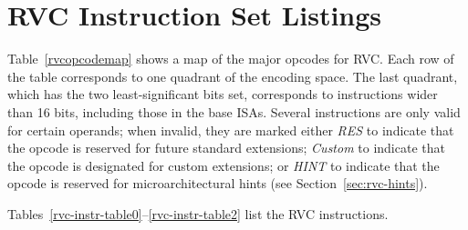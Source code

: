 \clearpage

\section{RVC Instruction Set Listings}

Table~\ref{rvcopcodemap} shows a map of the major opcodes for RVC.
Each row of the table corresponds to one quadrant of the encoding
space.  The last quadrant, which has the two
least-significant bits set, corresponds to instructions wider
than 16 bits, including those in the base ISAs.  Several instructions
are only valid for certain operands; when invalid, they are marked
either {\em RES} to indicate that the opcode is reserved for future
standard extensions; {\em Custom} to indicate that the opcode is designated
for custom extensions; or {\em HINT} to indicate that the opcode
is reserved for microarchitectural hints (see Section~\ref{sec:rvc-hints}).



Tables~\ref{rvc-instr-table0}--\ref{rvc-instr-table2} list the RVC instructions.

